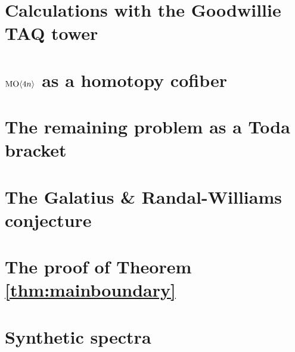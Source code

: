 \documentclass[reqno]{amsart}
\begin{document}
\section{Calculations with the Goodwillie TAQ tower} \label{sec:Goodwillie}


\section{\texorpdfstring{$\operatorname{\mathrm{MO}} \langle 4n \rangle$}{MO<4n>} as a homotopy cofiber} \label{sec:ThomPushout}


\section{The remaining problem as a Toda bracket} \label{sec:Toda}


%

%
%

%

\section{The Galatius \& Randal-Williams conjecture} \label{sec:Finale}


\section{The proof of Theorem \ref{thm:mainboundary}} \label{sec:FinishingStolz}


\section{Synthetic spectra} \label{sec:SyntheticReview}


\end{document}
